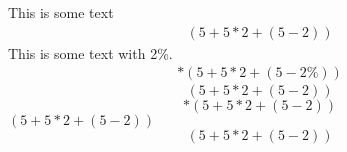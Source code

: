 This is some text
\begin{align}\label{equ1(good)}%
(5+5*2+(5-2))%
\end{align}
This is some text with 2\%.
\begin{align}*
(5+5*2+(5-2\%))
\end{align}
\begin{equation}\label{equ2(good)}
(5+5*2+(5-2))%
\end{equation}
\begin{equation}*
(5+5*2+(5-2))
\end{equation}
\((5+5*2+(5-2))\)
\[(5+5*2+(5-2))\]
